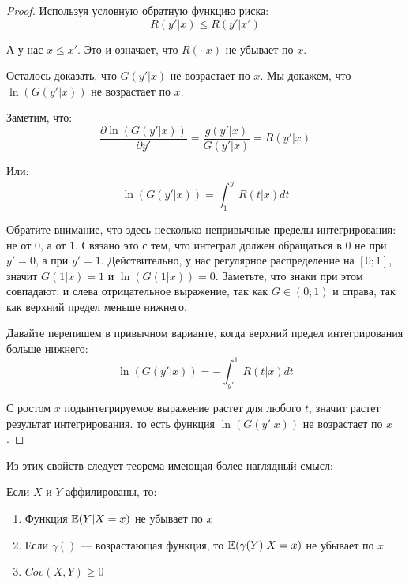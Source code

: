 \begin{proof}
Используя условную обратную функцию риска:
\begin{equation}
R(y'|x)\leq R(y'|x')
\end{equation}

А у нас $ x\leq x' $. Это и означает, что $ R(\cdot|x) $ не убывает по $ x $.

Осталось доказать, что $ G(y'|x) $ не возрастает по $ x $. Мы докажем, что $ \ln (G(y'|x)) $ не возрастает по $ x $.

Заметим, что:
\begin{equation}
\frac{\partial \ln (G(y'|x))}{\partial y'}=\frac{g(y'|x)}{G(y'|x)}=R(y'|x)
\end{equation}

Или:
\begin{equation}
\ln(G(y'|x))=\int_{1}^{y'}R(t|x)dt
\end{equation}

Обратите внимание, что здесь несколько непривычные пределы интегрирования: не от $0$, а от $ 1 $. Связано это с тем, что интеграл должен обращаться в 0 не при $ y'=0 $, а при $ y'=1 $. Действительно, у нас регулярное распределение на $ [0;1] $, значит $ G(1|x)=1 $ и $ \ln (G(1|x))=0 $. Заметьте, что знаки при этом совпадают: и слева отрицательное выражение, так как $ G\in (0;1) $ и справа, так как верхний предел меньше нижнего.

Давайте перепишем в привычном варианте, когда верхний предел интегрирования больше нижнего:
\begin{equation}
\ln(G(y'|x))=-\int_{y'}^{1}R(t|x)dt
\end{equation}

С ростом $ x $ подынтегрируемое выражение растет для любого $ t $, значит растет результат интегрирования. то есть функция $\ln( G(y'|x) )$ не возрастает по $ x $.

\end{proof}









Из этих свойств следует теорема имеющая более наглядный смысл:
\begin{myth} \label{prop_affiliated}
Если $ X $ и $ Y $ аффилированы, то:
\begin{enumerate}
\item Функция $ \mathbb{E}(Y|X=x )$ не убывает по $ x $
\item Если $ \gamma() $ — возрастающая функция, то $ \mathbb{E}(\gamma(Y)|X=x) $ не убывает по $ x $
\item $ Cov(X,Y)\geq 0 $
\end{enumerate}
\end{myth}




